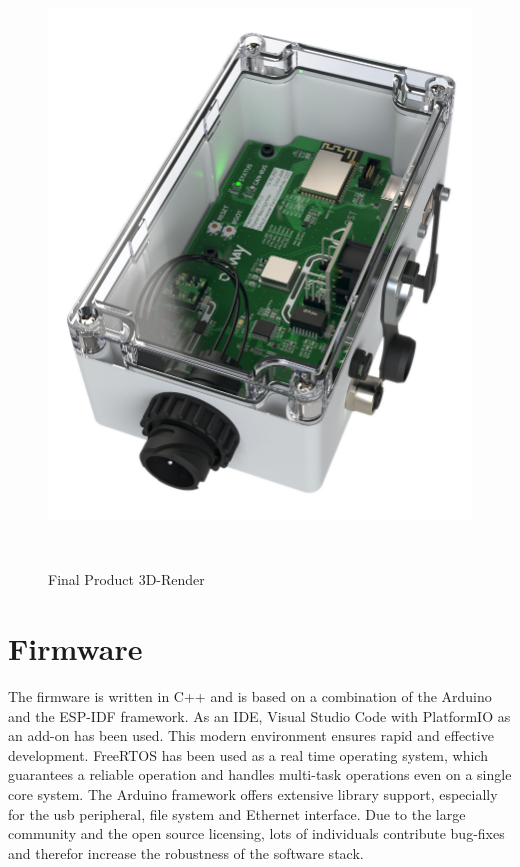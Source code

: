 \medskip
\begin{figure}[h!]
	\centering
	\includegraphics[height=16cm]{images/fleet-monitor-rendering}
	\caption{Final Product 3D-Render}
	\label{fig:fleet-monitor-rendering}
\end{figure}


\newpage
\section{Firmware}
The firmware is written in C++ and is based on a combination of the Arduino and the ESP-IDF framework. As an IDE, Visual Studio Code with PlatformIO as an add-on has been used. This modern environment ensures rapid and effective development.\newline
FreeRTOS has been used as a real time operating system, which guarantees a reliable operation and handles multi-task operations even on a single core system.\newline
The Arduino framework offers extensive library support, especially for the \acrshort{usb} peripheral, file system and Ethernet interface. Due to the large community and the open source licensing, lots of individuals contribute bug-fixes and therefor increase the robustness of the software stack.

